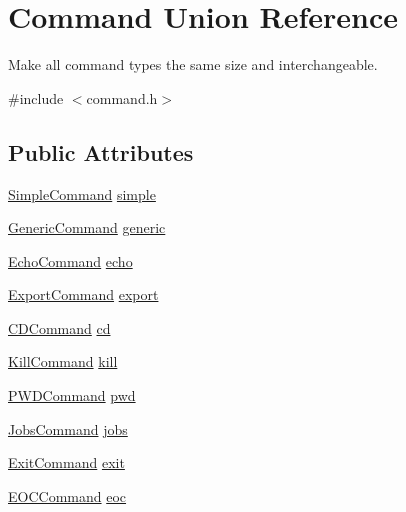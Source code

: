 \hypertarget{unionCommand}{}\section{Command Union Reference}
\label{unionCommand}


Make all command types the same size and interchangeable.  




{\ttfamily \#include $<$command.\+h$>$}

\subsection*{Public Attributes}
\begin{DoxyCompactItemize}
\item 
\hyperlink{structSimpleCommand}{Simple\+Command} \hyperlink{unionCommand_a269da4d9b16689de14a0ec83636b59e8}{simple}
\item 
\hyperlink{structGenericCommand}{Generic\+Command} \hyperlink{unionCommand_a22a7dad0e3935c261a1643c8c5ea46aa}{generic}
\item 
\hyperlink{command_8h_a8dc22d719c880c1ffcd9bc2dc5773633}{Echo\+Command} \hyperlink{unionCommand_a74de4769cc35dac9a3f7dfd24cb87ad7}{echo}
\item 
\hyperlink{structExportCommand}{Export\+Command} \hyperlink{unionCommand_a57e7a8eb0763aa7105d3bc6a52e59da3}{export}
\item 
\hyperlink{structCDCommand}{C\+D\+Command} \hyperlink{unionCommand_a488c8f6e6ce10f7c9126f37c5f37776d}{cd}
\item 
\hyperlink{structKillCommand}{Kill\+Command} \hyperlink{unionCommand_a19c5261961f2f9a7fcbf9f5379d3f98a}{kill}
\item 
\hyperlink{command_8h_a0c0e44e3e2b07b1e9b48023205cb4ca2}{P\+W\+D\+Command} \hyperlink{unionCommand_a34fc21bb2a7fee2df4d3674b9d8166ff}{pwd}
\item 
\hyperlink{command_8h_a027de4ed5fe4b0313c6c8ee0c2c1806b}{Jobs\+Command} \hyperlink{unionCommand_abeb4905f11baf90a800fe211dd5ecdc9}{jobs}
\item 
\hyperlink{command_8h_a354cb87bc40859e5595de56b675732bc}{Exit\+Command} \hyperlink{unionCommand_ab516bde009e6b06c4b342d7f5bf35ece}{exit}
\item 
\hyperlink{command_8h_ae5bf5cf7a34428c221f28179034dd125}{E\+O\+C\+Command} \hyperlink{unionCommand_a062a1645e04deb34460595c902a49c44}{eoc}
\end{DoxyCompactItemize}


